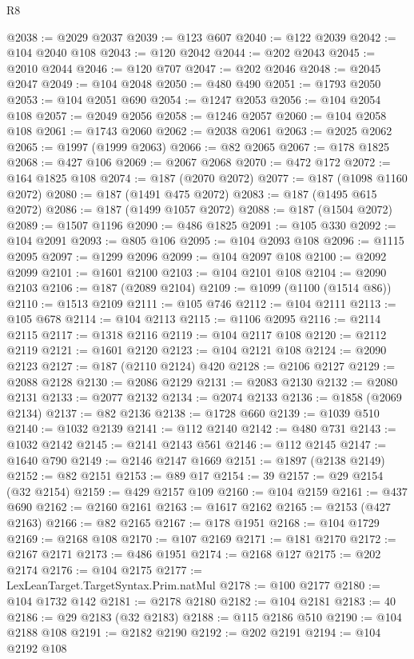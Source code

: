 \begin{lexlean}{R8}
\begin{coremodule}
@2038 := @2029 @2037
@2039 := @123 @607
@2040 := @122 @2039
@2042 := @104 @2040 @108
@2043 := @120 @2042
@2044 := @202 @2043
@2045 := @2010 @2044
@2046 := @120 @707
@2047 := @202 @2046
@2048 := @2045 @2047
@2049 := @104 @2048
@2050 := @480 @490
@2051 := @1793 @2050
@2053 := @104 @2051 @690
@2054 := @1247 @2053
@2056 := @104 @2054 @108
@2057 := @2049 @2056
@2058 := @1246 @2057
@2060 := @104 @2058 @108
@2061 := @1743 @2060
@2062 := @2038 @2061
@2063 := @2025 @2062
@2065 := @1997 (@1999 @2063)
@2066 := @82 @2065
@2067 := @178 @1825
@2068 := @427 @106
@2069 := @2067 @2068
@2070 := @472 @172
@2072 := @164 @1825 @108
@2074 := @187 (@2070 @2072)
@2077 := @187 (@1098 @1160 @2072)
@2080 := @187 (@1491 @475 @2072)
@2083 := @187 (@1495 @615 @2072)
@2086 := @187 (@1499 @1057 @2072)
@2088 := @187 (@1504 @2072)
@2089 := @1507 @1196
@2090 := @486 @1825
@2091 := @105 @330
@2092 := @104 @2091
@2093 := @805 @106
@2095 := @104 @2093 @108
@2096 := @1115 @2095
@2097 := @1299 @2096
@2099 := @104 @2097 @108
@2100 := @2092 @2099
@2101 := @1601 @2100
@2103 := @104 @2101 @108
@2104 := @2090 @2103
@2106 := @187 (@2089 @2104)
@2109 := @1099 (@1100 (@1514 @86))
@2110 := @1513 @2109
@2111 := @105 @746
@2112 := @104 @2111
@2113 := @105 @678
@2114 := @104 @2113
@2115 := @1106 @2095
@2116 := @2114 @2115
@2117 := @1318 @2116
@2119 := @104 @2117 @108
@2120 := @2112 @2119
@2121 := @1601 @2120
@2123 := @104 @2121 @108
@2124 := @2090 @2123
@2127 := @187 (@2110 @2124) @420
@2128 := @2106 @2127
@2129 := @2088 @2128
@2130 := @2086 @2129
@2131 := @2083 @2130
@2132 := @2080 @2131
@2133 := @2077 @2132
@2134 := @2074 @2133
@2136 := @1858 (@2069 @2134)
@2137 := @82 @2136
@2138 := @1728 @660
@2139 := @1039 @510
@2140 := @1032 @2139
@2141 := @112 @2140
@2142 := @480 @731
@2143 := @1032 @2142
@2145 := @2141 @2143 @561
@2146 := @112 @2145
@2147 := @1640 @790
@2149 := @2146 @2147 @1669
@2151 := @1897 (@2138 @2149)
@2152 := @82 @2151
@2153 := @89 @17
@2154 := 39
@2157 := @29 @2154 (@32 @2154)
@2159 := @429 @2157 @109
@2160 := @104 @2159
@2161 := @437 @690
@2162 := @2160 @2161
@2163 := @1617 @2162
@2165 := @2153 (@427 @2163)
@2166 := @82 @2165
@2167 := @178 @1951
@2168 := @104 @1729
@2169 := @2168 @108
@2170 := @107 @2169
@2171 := @181 @2170
@2172 := @2167 @2171
@2173 := @486 @1951
@2174 := @2168 @127
@2175 := @202 @2174
@2176 := @104 @2175
@2177 := LexLeanTarget.TargetSyntax.Prim.natMul
@2178 := @100 @2177
@2180 := @104 @1732 @142
@2181 := @2178 @2180
@2182 := @104 @2181
@2183 := 40
@2186 := @29 @2183 (@32 @2183)
@2188 := @115 @2186 @510
@2190 := @104 @2188 @108
@2191 := @2182 @2190
@2192 := @202 @2191
@2194 := @104 @2192 @108

\end{coremodule}
\end{lexlean}
